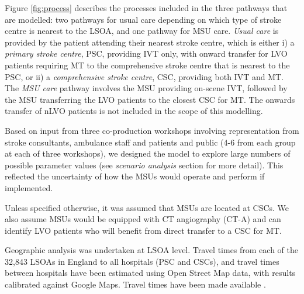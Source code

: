 Figure \ref{fig:process} describes the processes included in the three pathways that are modelled: two pathways for usual care depending on which type of stroke centre is nearest to the LSOA, and one pathway for MSU care. \textit{Usual care} is provided by the patient attending their nearest stroke centre, which is either i) a \textit{primary stroke centre}, PSC, providing IVT only, with onward transfer for LVO patients  requiring MT to the comprehensive stroke centre that is nearest to the PSC, or ii) a \textit{comprehensive stroke centre}, CSC, providing both IVT and MT. The \textit{MSU care} pathway involves the MSU providing on-scene IVT, followed by the MSU transferring the LVO patients to the closest CSC for MT. The onwards transfer of nLVO patients is not included in the scope of this modelling.

Based on input from three co-production workshops \cite{moseley_co-design_2024} involving representation from stroke consultants, ambulance staff and patients and public (4-6 from each group at each of three workshops), we designed the model to explore large numbers of possible parameter values (see \emph{scenario analysis} section for more detail). This reflected the uncertainty of how the MSUs would operate and perform if implemented.

Unless specified otherwise, it was assumed that MSUs are located at CSCs. We also assume MSUs would be equipped with CT angiography (CT-A) and can identify LVO patients who will benefit from direct transfer to a CSC for MT.

Geographic analysis was undertaken at LSOA level. Travel times from each of the 32,843 LSOAs in England to all hospitals (PSC and CSCs), and travel times between hospitals have been estimated using Open Street Map data, with results calibrated against Google Maps. Travel times have been made available \cite{gitlab1}.

